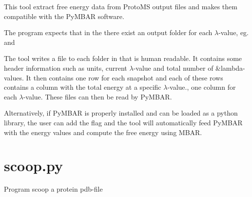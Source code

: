 \documentclass[letterpaper,10pt,english]{sphinxmanual}
\begin{document}

%
\begin{sphinxVerbatim}[commandchars=\\\{\}]
  
  
  
   
\end{sphinxVerbatim}


This tool extract free energy data from ProtoMS output files and makes them compatible with the PyMBAR software.

The program expects that in the  there exist an output folder for each \(\lambda\)-value, eg.  and 

The tool writes a file  to each folder in  that is human readable. It contains some header information such as units, current \(\lambda\)-value and total number of \&lambda-values. It then contains one row for each snapshot and each of these rows contains a column with the total energy at a specific \(\lambda\)-value., one column for each \(\lambda\)-value. These files can then be read by PyMBAR.

Alternatively, if PyMBAR is properly installed and can be loaded as a python library, the user can add the  flag and the tool will automatically feed PyMBAR with the energy values and compute the free energy using MBAR.


\section{scoop.py}
\label{\detokenize{tools:scoop-py}}

Program scoop a protein pdb-file
\end{document}
